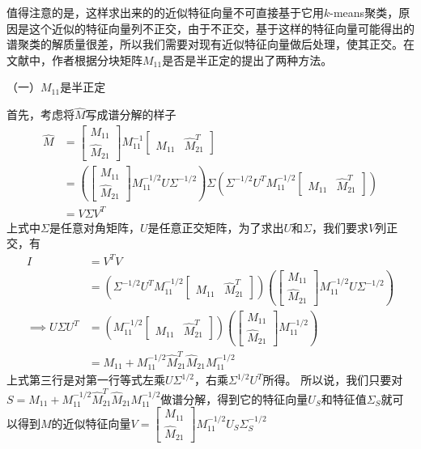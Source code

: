 值得注意的是，这样求出来的的近似特征向量不可直接基于它用$k$-means聚类，原因是这个近似的特征向量列不正交，由于不正交，基于这样的特征向量可能得出的谱聚类的解质量很差，所以我们需要对现有近似特征向量做后处理，使其正交。在文献\cite{fowlkes2004spectral}中，作者根据分块矩阵$M_{11}$是否是半正定的提出了两种方法。

（一）$M_{11}$是半正定

首先，考虑将$\hat{M}$写成谱分解的样子
\begin{align}
    \hat{M} &= \begin{bmatrix}
        M_{11} \\ \hat{M}_{21}
    \end{bmatrix} M_{11}^{-1}
    \begin{bmatrix}
        M_{11} & \hat{M}_{21}^T
    \end{bmatrix} \\
    &= \left( \begin{bmatrix}
        M_{11} \\ \hat{M}_{21}
    \end{bmatrix} M_{11}^{-1/2} U \Sigma^{-1/2} \right) \Sigma \left( \Sigma^{-1/2} U^T M_{11}^{-1/2} \begin{bmatrix}
        M_{11} & \hat{M}_{21}^T \end{bmatrix} \right) \\
    &= V\Sigma V^T
\end{align}
上式中$\Sigma$是任意对角矩阵，$U$是任意正交矩阵，为了求出$U$和$\Sigma$，我们要求$V$列正交，有
\begin{align}
    I &= V^T V \\
    &= \left( \Sigma^{-1/2} U^T M_{11}^{-1/2} \begin{bmatrix}
        M_{11} & \hat{M}_{21}^T \end{bmatrix} \right) \left( \begin{bmatrix}
        M_{11} \\ \hat{M}_{21} \end{bmatrix} M_{11}^{-1/2} U \Sigma^{-1/2} \right) \\
    \implies U\Sigma U^T &= \left( M_{11}^{-1/2} \begin{bmatrix}
        M_{11} & \hat{M}_{21}^T \end{bmatrix} \right) \left( \begin{bmatrix}
        M_{11} \\ \hat{M}_{21} \end{bmatrix} M_{11}^{-1/2} \right) \\
        &= M_{11} + M_{11}^{-1/2} \hat{M}_{21}^T \hat{M}_{21} M_{11}^{-1/2}
\end{align}
上式第三行是对第一行等式左乘$U \Sigma^{1/2}$，右乘$\Sigma^{1/2} U^T$所得。
所以说，我们只要对$S = M_{11} + M_{11}^{-1/2} \hat{M}_{21}^T \hat{M}_{21} M_{11}^{-1/2}$做谱分解，得到它的特征向量$U_S$和特征值$\Sigma_S$就可以得到$M$的近似特征向量$V = \begin{bmatrix} M_{11} \\ \hat{M}_{21} \end{bmatrix} M_{11}^{-1/2} U_S \Sigma_S^{-1/2}$

